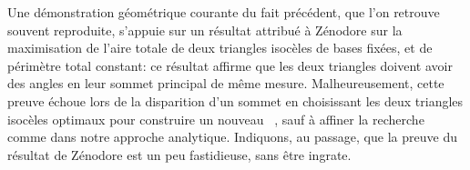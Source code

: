 \begin{remark}
	Une démonstration géométrique courante du fait précédent, que l'on retrouve souvent reproduite, s'appuie sur un résultat attribué à Zénodore sur la maximisation de l'aire totale de deux triangles isocèles de bases fixées, et de périmètre total constant:
	ce résultat affirme que les deux triangles doivent avoir des angles en leur sommet principal de même mesure.
	Malheureusement, cette preuve échoue lors de la disparition d'un sommet en choisissant les deux triangles isocèles optimaux pour construire un nouveau \ngone\ , sauf à affiner la recherche comme dans notre approche analytique.
	Indiquons, au passage, que la preuve du résultat de Zénodore est un peu fastidieuse, sans être ingrate.
\end{remark}
%	
%
%
%


